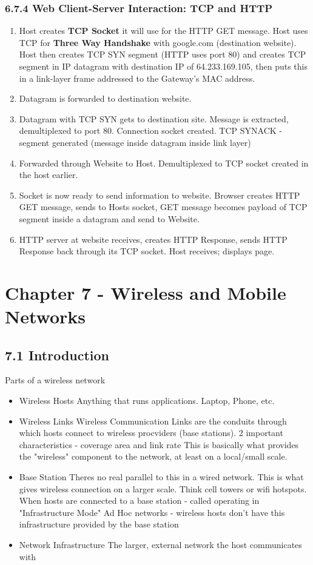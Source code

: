 \documentclass[11pt]{article}
\begin{document}
\subsubsection{6.7.4 Web Client-Server Interaction: TCP and HTTP}
\label{sec:orgad30bc5}
\begin{enumerate}
\item Host creates \textbf{TCP Socket} it will use for the HTTP GET message. Host uses TCP for \textbf{Three Way Handshake} with google.com (destination website). Host then creates TCP SYN segment (HTTP uses port 80) and creates TCP segment in IP datagram with destination IP of 64.233.169.105, then puts this in a link-layer frame addressed to the Gateway's MAC address.
\item Datagram is forwarded to destination website.
\item Datagram with TCP SYN gets to destination site. Message is extracted, demultiplexed to port 80. Connection socket created. TCP SYNACK - segment generated (message inside datagram inside link layer)
\item Forwarded through Website to Host. Demultiplexed to TCP socket created in the host earlier.
\item Socket is now ready to send information to website. Browser creates HTTP GET message, sends to Hosts socket, GET message becomes payload of TCP segment inside a datagram and send to Website.
\item HTTP server at website receives, creates HTTP Response, sends HTTP Response back through its TCP socket. Host receives; displays page.
\end{enumerate}

\section{Chapter 7 - Wireless and Mobile Networks}
\label{sec:org72ef512}

\subsection{7.1 Introduction}
\label{sec:orgec89cfd}
Parts of a wireless network
\begin{itemize}
\item Wireless Hosts
Anything that runs applications. Laptop, Phone, etc.
\item Wireless Links
Wireless Communication Links are the conduits through which hosts connect to wireless procviders (base stations).
2 important characteristics - coverage area and link rate
This is basically what provides the "wireless" component to the network, at least on a local/small scale.
\item Base Station
Theres no real parallel to this in a wired network. This is what gives wireless connection on a larger scale. Think cell towers or wifi hotspots.
When hosts are connected to a base station - called operating in "Infrastructure Mode"
Ad Hoc networks - wireless hosts don't have this infrastructure provided by the base station
\item Network Infrastructure
The larger, external network the host communicates with
\end{itemize}
\end{document}
